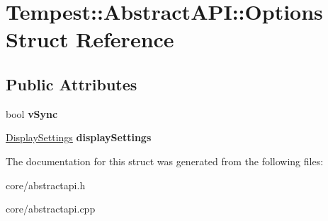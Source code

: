\hypertarget{struct_tempest_1_1_abstract_a_p_i_1_1_options}{\section{Tempest\+:\+:Abstract\+A\+P\+I\+:\+:Options Struct Reference}
\label{struct_tempest_1_1_abstract_a_p_i_1_1_options}
}
\subsection*{Public Attributes}
\begin{DoxyCompactItemize}
\item 
\hypertarget{struct_tempest_1_1_abstract_a_p_i_1_1_options_a047b55a221e1adc16ec4b62dc8e98d3c}{bool {\bfseries v\+Sync}}\label{struct_tempest_1_1_abstract_a_p_i_1_1_options_a047b55a221e1adc16ec4b62dc8e98d3c}

\item 
\hypertarget{struct_tempest_1_1_abstract_a_p_i_1_1_options_a5d574598841b7a1b721b07d3ea1daa70}{\hyperlink{class_tempest_1_1_display_settings}{Display\+Settings} {\bfseries display\+Settings}}\label{struct_tempest_1_1_abstract_a_p_i_1_1_options_a5d574598841b7a1b721b07d3ea1daa70}

\end{DoxyCompactItemize}


The documentation for this struct was generated from the following files\+:\begin{DoxyCompactItemize}
\item 
core/abstractapi.\+h\item 
core/abstractapi.\+cpp\end{DoxyCompactItemize}
